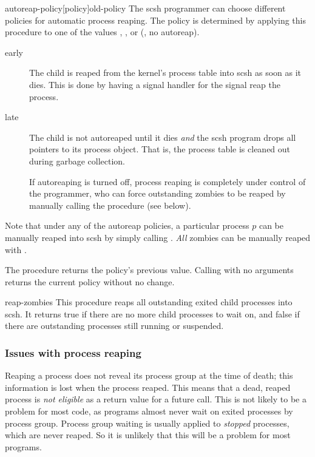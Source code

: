 \begin{defundesc}{autoreap-policy}{[policy]}{old-policy}
The scsh programmer can choose different policies for automatic
process reaping.
The policy is determined by applying this procedure to one of the
values , , or {\sharpf} (\ie, no autoreap).
\begin{description}
\item [early]
        The child is reaped from the {\Unix} kernel's process table
        into scsh as soon as it dies. This is done by having a
        signal handler for the  signal reap the process.

\item [late]
        The child is not autoreaped until it dies \emph{and} the scsh program
        drops all pointers to its process object. That is, the process
        table is cleaned out during garbage collection.

\item [\sharpf]
        If autoreaping is turned off, process reaping is completely under
        control of the programmer, who can force outstanding zombies to
        be reaped by manually calling the  procedure
        (see below).
\end{description}
Note that under any of the autoreap policies, a particular process $p$ can
be manually reaped into scsh by simply calling .
\emph{All} zombies can be manually reaped with .

The  procedure returns the policy's previous value.
Calling  with no arguments returns the current
policy without no change.
\end{defundesc}


\begin{defundesc}{reap-zombies}{}{\boolean}
This procedure reaps all outstanding exited child processes into scsh.
It returns true if there are no more child processes to wait on, and
false if there are outstanding processes still running or suspended.
\end{defundesc}

\subsubsection{Issues with process reaping}
Reaping a process does not reveal its process group at the time of
death; this information is lost when the process reaped.
This means that a dead, reaped process is \emph{not eligible} as a return
value for a future  call.
This is not likely to be a problem for most code, as programs almost
never wait on exited processes by process group.
Process group waiting is usually applied to \emph{stopped} processes,
which are never reaped. 
So it is unlikely that this will be a problem for most programs.

